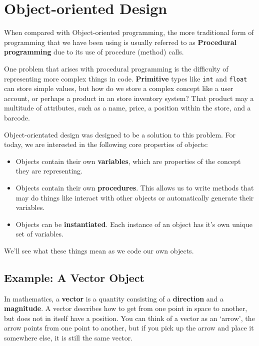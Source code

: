 \section{Object-oriented Design}

	When compared with Object-oriented programming, the more traditional form of programming that we have been using is usually referred to as \textbf{Procedural programming} due to its use of procedure (method) calls.
	
	One problem that arises with procedural programming is the difficulty of representing more complex things in code. \textbf{Primitive} types like \texttt{int} and \texttt{float} can store simple values, but how do we store a complex concept like a user account, or perhaps a product in an store inventory system? That product may a multitude of attributes, such as a name, price, a position within the store, and a barcode.
	
	Object-orientated design was designed to be a solution to this problem. For today, we are interested in the following core properties of objects:
	
	\begin{itemize}
		\item Objects contain their own \textbf{variables}, which are properties of the concept they are representing.
		\item Objects contain their own \textbf{procedures}. This allows us to write methods that may do things like interact with other objects or automatically generate their variables.
		\item Objects can be \textbf{instantiated}. Each instance of an object has it's own unique set of variables.
	\end{itemize}

	We'll see what these things mean as we code our own objects.


	\subsection{Example: A Vector Object}
	
		In mathematics, a \textbf{vector} is a quantity consisting of a \textbf{direction} and a \textbf{magnitude}. A vector describes how to get from one point in space to another, but does not in itself have a position. You can think of a vector as an `arrow', the arrow points from one point to another, but if you pick up the arrow and place it somewhere else, it is still the same vector.
		
